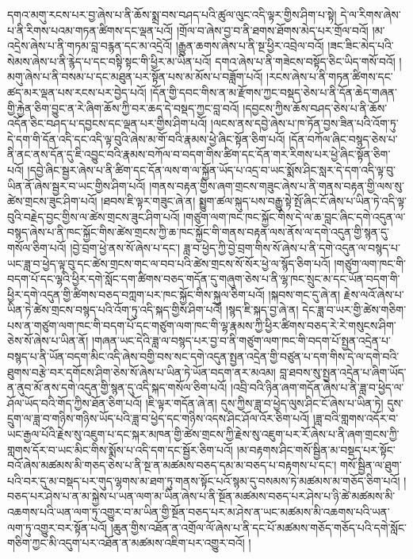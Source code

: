 དགའ་མགུ་རངས་པར་བྱ་ཞེས་པ་ནི་ཆོས་སྨྲ་བས་བཤད་པའི་ཚུལ་ལུང་འདི་ལྟར་གྱིས་ཤིག་པ་སྟེ། དེ་ལ་རིགས་ཞེས་པ་ནི་རིགས་པའམ་གཏན་ཚིགས་དང་ལྡན་པའོ། །གྲོལ་བ་ཞེས་བྱ་བ་ནི་ཐགས་ཐོགས་མེད་པར་གྲོལ་བའོ། །མ་འདྲེས་ཞེས་པ་ནི་གཏམ་བླ་བརྙན་དང་མ་འདྲེའོ། །རྒྱུན་ཆགས་ཞེས་པ་ནི་སྔ་ཕྱིར་འབྲེལ་བའོ། །ཟང་ཟིང་མེད་པའི་སེམས་ཞེས་པ་ནི་རྙེད་པ་དང་བསྟི་སྟང་གི་ཕྱིར་མ་ཡིན་པའོ། དགའ་ཞེས་པ་ནི་གཟེངས་བསྟོད་ཅིང་ཡིད་གསོ་བའོ། །མགུ་ཞེས་པ་ནི་བསམ་པ་དང་མཐུན་པར་སྟོན་པས་མ་མོས་པ་བཟློག་པའོ། །རངས་ཞེས་པ་ནི་གཏན་ཚིགས་དང་ཚད་མར་ལྡན་པས་རངས་པར་བྱེད་པའོ། །དོན་གྱི་དབང་གིས་ན་མ་རྫོགས་ཀྱང་བསྡད་ཅེས་པ་ནི་དོན་ཆེད་གཞན་གྱི་རྐྱེན་ཅིག་བྱུང་ན་རེ་ཞིག་ཆོས་ཀྱི་བར་ཆད་དེ་བསྡད་ཀྱང་བླ་བའོ། །དབྱངས་ཀྱིས་ཆོས་བཤད་ཅེས་པ་ནི་ཆོས་འདོན་ཅིང་བཤད་པ་དབྱངས་དང་ལྡན་པར་གྱིས་ཤིག་པའོ། །ལངས་ནས་དབྱེ་ཞེས་པ་ཁ་ཏོན་བྱས་ཟིན་པའི་འོག་ཏུ་དེ་དག་གི་དོན་འདི་དང་འདི་ལྟ་བུའི་ཞེས་མ་གོ་བའི་རྣམས་ཕྱེ་ཞིང་སྟོན་ཅིག་པའོ། །དོན་བཀོལ་ཞིང་བསྙད་ཅེས་པ་ནི་ནང་ནས་དོན་དུ་ཇི་འབྱུང་བའི་རྣམས་བཀོལ་བ་བདག་གིས་ཚིག་དང་དོན་གར་རིགས་པར་ཕྱེ་ཞིང་སྟོན་ཅིག་པའོ། །དབྱེ་ཞིང་སྦྱར་ཞེས་པ་ནི་ཚིག་དང་དོན་ལས་ག་ལ་སྐྱོན་ཡོད་པ་འདྲ་བ་ཡང་སྨོས་ཤིང་སླར་དེ་དག་འདི་ལྟ་བུ་ཡིན་ནོ་ཞེས་སྦྱར་བ་ཡང་གྱིས་ཤིག་པའོ། །གནས་བརྟན་གྱིས་ཞག་གྲངས་གཟུང་ཞེས་པ་ནི་གནས་བརྟན་གྱི་ལས་སུ་ཚེས་གྲངས་ཟུང་ཤིག་པའོ། །ཐབས་ཇི་ལྟར་གཟུང་ཞེ་ན། སྨྱུག་ཚལ་སྐུད་པས་བརྒྱུ་སྟེ་སྤོ་ཞིང་ངོ་ཞེས་པ་ཡིན་ཏེ་འདི་ལྟ་བུའི་བརྗེད་བྱང་གྱིས་ལ་ཚེས་གྲངས་ཟུང་ཤིག་པའོ། །གཙུག་ལག་ཁང་ཁང་སྐྱོང་གིས་དེ་ལ་ཆ་བླང་ཞིང་དགེ་འདུན་ལ་བསྙད་ཞེས་པ་ནི་ཁང་སྐྱོང་གིས་ཚེས་གྲངས་ཀྱི་ཆ་ཁང་སྐྱོང་གི་གནས་བརྟན་ལས་ནོས་ལ་དགེ་འདུན་གྱི་སྙན་དུ་གསོལ་ཅིག་པའོ། །བྱེ་བྲག་ཕྱེ་ནས་སོ་ཞེས་པ་དང་། ཟླ་བ་ཕྱེད་ཀྱི་བྱེ་བྲག་གིས་སོ་ཞེས་པ་ནི་དགེ་འདུན་ལ་བསྙད་པ་ཡང་ཟླ་བ་ཕྱེད་ལྟ་བུ་དང་ཚེས་གྲངས་གང་ལ་བབ་པའི་ཚེས་གྲངས་སོ་སོར་ཕྱེ་ལ་སྙོད་ཅིག་པའོ། །གཙུག་ལག་ཁང་གི་བདག་པོ་དང་ལྷའི་ཕྱིར་དགེ་སློང་དག་ཚིགས་བཅད་གདོན་དུ་གཞུག་ཅེས་པ་ནི་ལྷ་ཁང་སྲུང་མ་དང་ཡོན་བདག་གི་ཕྱིར་དགེ་འདུན་གྱི་ཚིགས་བཅད་བཀླག་པར་ཁང་སྐྱོང་གིས་སྐུལ་ཅིག་པའོ། །སྐབས་གང་དུ་ཞེ་ན། རྗེས་ལའོ་ཞེས་པ་ཡིན་ཏེ་ཚེས་གྲངས་བསྙད་པའི་འོག་ཏུ་འདི་སྐད་གྱིས་ཤིག་པའོ། །སྙད་ཇི་སྐད་བྱ་ཞེ་ན། དེང་ཟླ་བ་ཡར་གྱི་ཚེས་གཅིག་པས་ན་གཙུག་ལག་ཁང་གི་བདག་པོ་དང་གཙུག་ལག་ཁང་གི་ལྷ་རྣམས་ཀྱི་ཕྱིར་ཚིགས་བཅད་རེ་རེ་གསུངས་ཤིག་ཅེས་སོ་ཞེས་པ་ཡིན་ནོ། །གཞན་ཡང་དེའི་ཟླ་ལ་བསྙད་པར་བྱ་བ་ནི་གཙུག་ལག་ཁང་གི་བདག་པོ་སྤྱན་འདྲེན་པ་བསྙད་པ་ནི་ཡོན་བདག་མིང་འདི་ཞེས་བགྱི་བས་སང་དགེ་འདུན་སྤྱན་འདྲེན་གྱི་བཙུན་པ་དག་གིས་དེ་ལ་དགེ་བའི་ཐུགས་བརྩེ་བར་དགོངས་ཤིག་ཅེས་སོ་ཞེས་པ་ཡིན་ཏེ་ཡོན་བདག་ནར་མའམ། བླ་ཐབས་སུ་སྤྱན་འདྲེན་པ་ཞིག་ཡོད་ན་ནུབ་མོ་ནས་དགེ་འདུན་གྱི་སྙན་དུ་འདི་སྐད་གསོལ་ཅིག་པའོ། །འབྲི་བའི་ཉིན་ཞག་གདོན་ཞེས་པ་ནི་ཟླ་བ་ཕྱེད་ལ་ཤོལ་ཡོད་བའི་གོད་ཀྱིས་ཐོན་ཅིག་པའོ། །ཇི་ལྟར་གདོན་ཞེ་ན། དུས་ཀྱིས་ཟླ་བ་ཕྱེད་ལུས་ཤིང་ངོ་ཞེས་པ་ཡིན་ཏེ། དུས་དྲུག་ལ་ཟླ་བ་གཉིས་གཉིས་ཡོད་པའི་ཟླ་བ་ཕྱེད་དང་གཉིས་འདས་ཤིང་ཤོལ་འོར་ཅིག་པའོ། །ཟླ་བའི་གླགས་འདོར་བ་ཡང་རྒྱལ་པོའི་རྗེས་སུ་འཇུག་པ་དང་སྐར་མཁན་གྱི་ཚེས་གྲངས་ཀྱི་རྗེས་སུ་འཇུག་པར་རོ་ཞེས་པ་ནི་ཞག་གྲངས་ཀྱི་གླགས་དོར་བ་ཡང་མིང་གིས་སྨོས་པ་འདི་དག་དང་སྦྱོར་ཅིག་པའོ། །མ་བརྟགས་ཤིང་གསོ་སྦྱིན་མ་བསྡད་པར་སྟོང་བའོ་ཞེས་མཚམས་མི་གཅད་ཅེས་པ་ནི་སྔ་ན་མཚམས་བཅད་དམ་མ་བཅད་པ་བརྟགས་པ་དང་། གསོ་སྦྱིན་ལ་ཐུག་པའི་བར་དུ་མ་བསྡད་པར་གུད་ལྷགས་མ་ཐག་ཏུ་གནས་སྟོང་པའོ་སྙམ་དུ་བསམས་ཏེ་མཚམས་མ་གཅོད་ཅིག་པའོ། །བཅད་པར་ཤེས་པ་ན་མ་སྐྱེས་པ་ཡན་ལག་མ་ཡིན་ཞེས་པ་ནི་སྔོན་མཚམས་བཅད་པར་ཤེས་པ་ཉི་ཚེ་མཚམས་མི་འཆགས་པའི་ཡན་ལག་ཏུ་འགྱུར་བ་མ་ཡིན་གྱི་སྔོན་བཅད་པར་མ་ཤེས་ན་ཡང་མཚམས་མི་འཆགས་པའི་ཡན་ལག་ཏུ་འགྱུར་བར་སྟོན་པའོ། །ཆུན་གྱིས་འཐོན་ན་འགྲོལ་ལོ་ཞེས་པ་ནི་དང་པོ་མཚམས་གཅོད་གཅོད་པའི་དགེ་སློང་གཅིག་ཀྱང་མི་འདུག་པར་འཐོན་ན་མཚམས་འཇིག་པར་འགྱུར་བའོ། །
